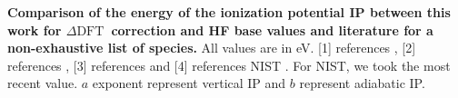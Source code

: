 \documentclass[article,preview]{planetary}
\newcommand{\dft}{\ensuremath{\Delta\textrm{DFT}}}
\begin{document}


\begin{table}[!hb]
    \centering
    \footnotesize

    \caption{\textbf{Comparison of the energy of the ionization potential IP between this work for \dft~correction and HF base values and literature for a non-exhaustive list of species.} All values are in eV. [1] references \textcite{gachesAstrochemistryLowenergyElectron2024}, [2] references \textcite{bourgalaisAccuratePredictionAdiabatic2023}, [3] references \textcite{giulianiIonizationEnergiesPolycyclic2026} and [4] references NIST \parencite{linstromNISTChemistryWebBook2001}. For NIST, we took the most recent value. $a$ exponent represent vertical IP and $b$ represent adiabatic IP.}
    \label{tab:zezeze}


\end{table}
\end{document}
